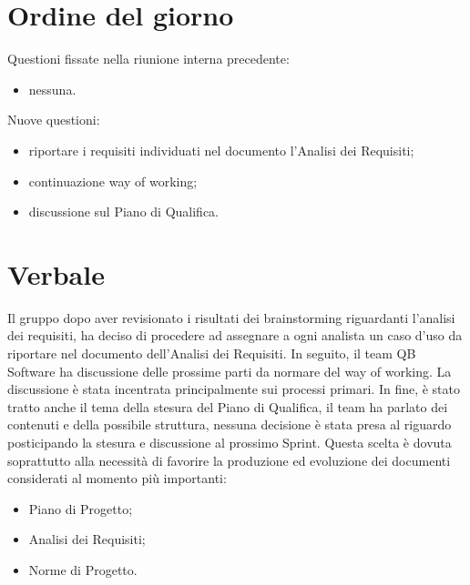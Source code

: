 \documentclass[12pt]{article}
\begin{document}
    \section{Ordine del giorno}
        Questioni fissate nella riunione interna precedente:
    	\begin{itemize}
    		\item nessuna.
    	\end{itemize}
    	Nuove questioni:
    	\begin{itemize}
			\item riportare i requisiti individuati nel documento l'Analisi dei Requisiti;
			\item continuazione way of working;
			\item discussione sul Piano di Qualifica.
    	\end{itemize}
    
    \section{Verbale}
		Il gruppo dopo aver revisionato i risultati dei brainstorming riguardanti l'analisi dei requisiti, ha deciso di procedere ad assegnare a ogni analista un caso d'uso da riportare nel documento dell'Analisi dei Requisiti. In seguito, il team QB Software ha discussione delle prossime parti da normare del way of working. La discussione è stata incentrata principalmente sui processi primari.
		In fine, è stato tratto anche il tema della stesura del Piano di Qualifica, il team ha parlato dei contenuti e della possibile struttura, nessuna decisione è stata presa al riguardo posticipando la stesura e discussione al prossimo Sprint. Questa scelta è dovuta soprattutto alla necessità di favorire la produzione ed evoluzione dei documenti considerati al momento più importanti:
		\begin{itemize}
			\item Piano di Progetto;
			\item Analisi dei Requisiti;
			\item Norme di Progetto.
		\end{itemize}
\end{document}
